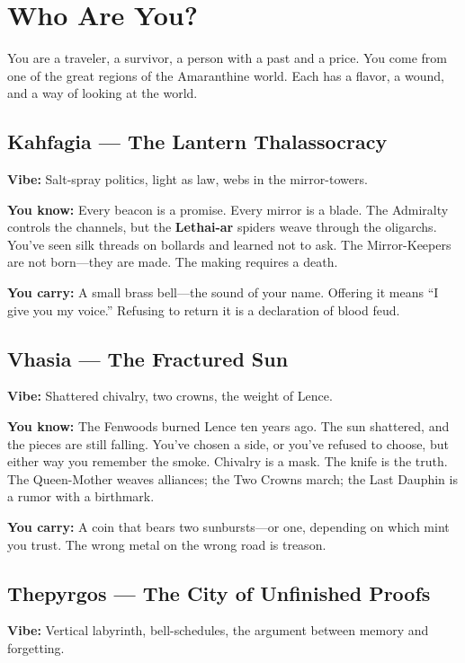 \documentclass[10pt]{article}
\begin{document}
\section*{Who Are You?}

You are a traveler, a survivor, a person with a past and a price. You come from one of 
the great regions of the Amaranthine world. Each has a flavor, a wound, and a way of 
looking at the world.

\subsection*{Kahfagia --- The Lantern Thalassocracy}

\textbf{Vibe:} Salt-spray politics, light as law, webs in the mirror-towers.

\textbf{You know:} Every beacon is a promise. Every mirror is a blade. The Admiralty 
controls the channels, but the \textbf{Lethai-ar} spiders weave through the oligarchs. 
You've seen silk threads on bollards and learned not to ask. The Mirror-Keepers are not 
born—they are made. The making requires a death.

\textbf{You carry:} A small brass bell—the sound of your name. Offering it means 
``I give you my voice.'' Refusing to return it is a declaration of blood feud.

\subsection*{Vhasia --- The Fractured Sun}

\textbf{Vibe:} Shattered chivalry, two crowns, the weight of Lence.

\textbf{You know:} The Fenwoods burned Lence ten years ago. The sun shattered, and 
the pieces are still falling. You've chosen a side, or you've refused to choose, but 
either way you remember the smoke. Chivalry is a mask. The knife is the truth. The 
Queen-Mother weaves alliances; the Two Crowns march; the Last Dauphin is a rumor with 
a birthmark.

\textbf{You carry:} A coin that bears two sunbursts—or one, depending on which 
mint you trust. The wrong metal on the wrong road is treason.

\subsection*{Thepyrgos --- The City of Unfinished Proofs}

\textbf{Vibe:} Vertical labyrinth, bell-schedules, the argument between memory and forgetting.
\end{document}
